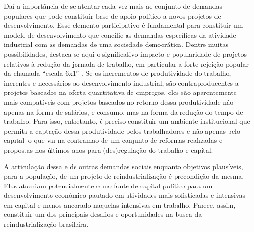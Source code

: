 Daí a importância de se atentar cada vez mais ao conjunto de demandas
populares que pode constituir base de apoio político a novos projetos de
desenvolvimento. Esse elemento participativo é fundamental para
constituir um modelo de desenvolvimento que concilie as demandas
específicas da atividade industrial com as demandas de uma sociedade
democrática. Dentre muitas possibilidades, destaca-se aqui o
significativo impacto e popularidade de projetos relativos à redução da
jornada de trabalho, em particular a forte rejeição popular da chamada
``escala 6x1'' . Se os incrementos de produtividade do
trabalho, inerentes e necessários ao desenvolvimento industrial, são
contraproducentes a projetos baseados na oferta quantitativa de
empregos, eles são aparentemente mais compatíveis com projetos baseados
no retorno dessa produtividade não apenas na forma de salários, e
consumo, mas na forma da redução do tempo de trabalho. Para isso,
entretanto, é preciso constituir um ambiente institucional que permita a
captação dessa produtividade pelos trabalhadores e não apenas pelo
capital, o que vai na contramão de um conjunto de reformas realizadas e
propostas nos últimos anos para (des)regulação do trabalho e capital.

A articulação dessa e de outras demandas sociais enquanto objetivos
plausíveis, para a população, de um projeto de reindustrialização é
precondição da mesma. Elas atuariam potencialmente como fonte de capital
político para um desenvolvimento econômico pautado em atividades mais
sofisticadas e intensivas em capital e menos ancorado naquelas
intensivas em trabalho. Parece, assim, constituir um dos principais
desafios e oportunidades na busca da reindustrialização brasileira.

